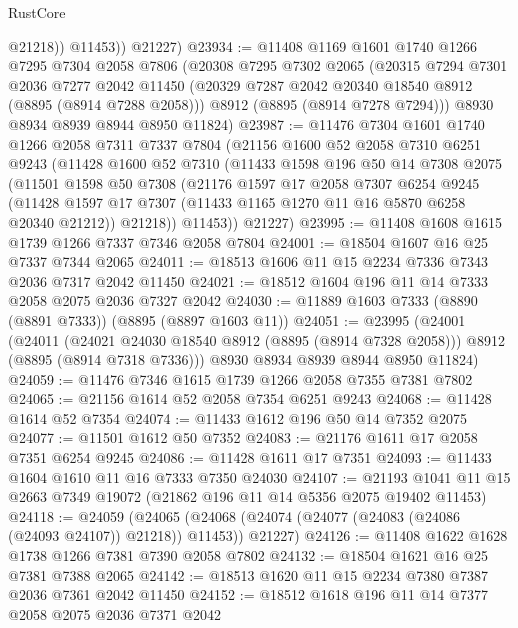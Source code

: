 \begin{lexlean}{RustCore}
\begin{coremodule}
              @21218))
          @11453))
      @21227)
@23934 := @11408
    @1169
    @1601
    @1740
    @1266
    @7295
    @7304
    @2058
    @7806
    (@20308
      @7295
      @7302
      @2065
      (@20315
        @7294
        @7301
        @2036
        @7277
        @2042
        @11450
        (@20329 @7287 @2042 @20340 @18540 @8912 (@8895 (@8914 @7288 @2058)))
        @8912
        (@8895 (@8914 @7278 @7294)))
      @8930
      @8934
      @8939
      @8944
      @8950
      @11824)
@23987 := @11476
    @7304
    @1601
    @1740
    @1266
    @2058
    @7311
    @7337
    @7804
    (@21156
      @1600
      @52
      @2058
      @7310
      @6251
      @9243
      (@11428
        @1600
        @52
        @7310
        (@11433
          @1598
          @196
          @50
          @14
          @7308
          @2075
          (@11501
            @1598
            @50
            @7308
            (@21176
              @1597
              @17
              @2058
              @7307
              @6254
              @9245
              (@11428 @1597 @17 @7307 (@11433 @1165 @1270 @11 @16 @5870 @6258 @20340 @21212))
              @21218))
          @11453))
      @21227)
@23995 := @11408 @1608 @1615 @1739 @1266 @7337 @7346 @2058 @7804
@24001 := @18504 @1607 @16 @25 @7337 @7344 @2065
@24011 := @18513 @1606 @11 @15 @2234 @7336 @7343 @2036 @7317 @2042 @11450
@24021 := @18512 @1604 @196 @11 @14 @7333 @2058 @2075 @2036 @7327 @2042
@24030 := @11889 @1603 @7333 (@8890 (@8891 @7333)) (@8895 (@8897 @1603 @11))
@24051 := @23995
    (@24001
      (@24011
        (@24021 @24030 @18540 @8912 (@8895 (@8914 @7328 @2058)))
        @8912
        (@8895 (@8914 @7318 @7336)))
      @8930
      @8934
      @8939
      @8944
      @8950
      @11824)
@24059 := @11476 @7346 @1615 @1739 @1266 @2058 @7355 @7381 @7802
@24065 := @21156 @1614 @52 @2058 @7354 @6251 @9243
@24068 := @11428 @1614 @52 @7354
@24074 := @11433 @1612 @196 @50 @14 @7352 @2075
@24077 := @11501 @1612 @50 @7352
@24083 := @21176 @1611 @17 @2058 @7351 @6254 @9245
@24086 := @11428 @1611 @17 @7351
@24093 := @11433 @1604 @1610 @11 @16 @7333 @7350 @24030
@24107 := @21193 @1041 @11 @15 @2663 @7349 @19072 (@21862 @196 @11 @14 @5356 @2075 @19402 @11453)
@24118 := @24059
    (@24065 (@24068 (@24074 (@24077 (@24083 (@24086 (@24093 @24107)) @21218)) @11453)) @21227)
@24126 := @11408 @1622 @1628 @1738 @1266 @7381 @7390 @2058 @7802
@24132 := @18504 @1621 @16 @25 @7381 @7388 @2065
@24142 := @18513 @1620 @11 @15 @2234 @7380 @7387 @2036 @7361 @2042 @11450
@24152 := @18512 @1618 @196 @11 @14 @7377 @2058 @2075 @2036 @7371 @2042

\end{coremodule}
\end{lexlean}
